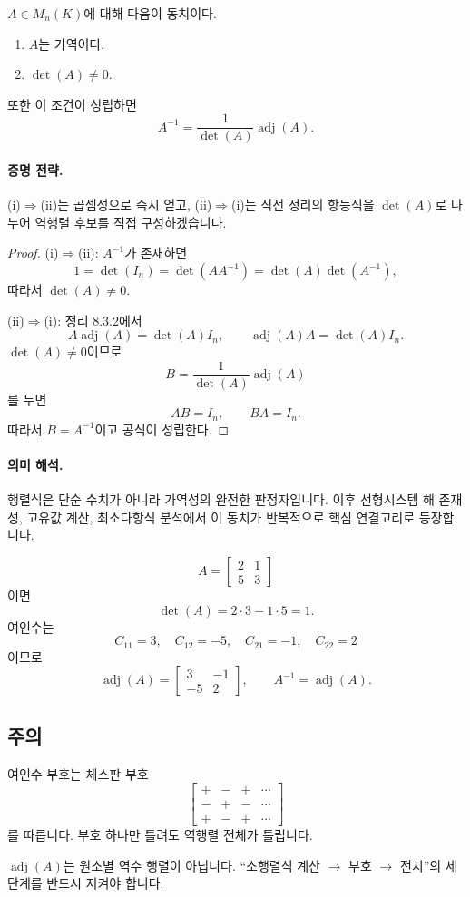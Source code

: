 \begin{theorem}
$A\in M_n(K)$에 대해 다음이 동치이다.
\begin{enumerate}[label=(\roman*)]
\item $A$는 가역이다.
\item $\det(A)\ne0$.
\end{enumerate}
또한 이 조건이 성립하면
$$
A^{-1}=\frac{1}{\det(A)}\operatorname{adj}(A).
$$
\end{theorem}

\paragraph{증명 전략.}
(i)$\Rightarrow$(ii)는 곱셈성으로 즉시 얻고, (ii)$\Rightarrow$(i)는 직전 정리의 항등식을 $\det(A)$로 나누어 역행렬 후보를 직접 구성하겠습니다.

\begin{proof}
(i)$\Rightarrow$(ii): $A^{-1}$가 존재하면
$$
1=\det(I_n)=\det(AA^{-1})=\det(A)\det(A^{-1}),
$$
따라서 $\det(A)\ne0$.

(ii)$\Rightarrow$(i): 정리 8.3.2에서
$$
A\operatorname{adj}(A)=\det(A)I_n,\qquad
\operatorname{adj}(A)A=\det(A)I_n.
$$
$\det(A)\ne0$이므로
$$
B=\frac{1}{\det(A)}\operatorname{adj}(A)
$$
를 두면
$$
AB=I_n,\qquad BA=I_n.
$$
따라서 $B=A^{-1}$이고 공식이 성립한다.
\end{proof}

\paragraph{의미 해석.}
행렬식은 단순 수치가 아니라 가역성의 완전한 판정자입니다. 이후 선형시스템 해 존재성, 고유값 계산, 최소다항식 분석에서 이 동치가 반복적으로 핵심 연결고리로 등장합니다.

\begin{example}
$$
A=\begin{bmatrix}2&1\\5&3\end{bmatrix}
$$
이면
$$
\det(A)=2\cdot3-1\cdot5=1.
$$
여인수는
$$
C_{11}=3,\quad C_{12}=-5,\quad C_{21}=-1,\quad C_{22}=2
$$
이므로
$$
\operatorname{adj}(A)=\begin{bmatrix}3&-1\\-5&2\end{bmatrix},
\qquad
A^{-1}=\operatorname{adj}(A).
$$
\end{example}

\subsection*{주의}
\begin{warning}
여인수 부호는 체스판 부호
$$
\begin{bmatrix}
+&-&+&\cdots\\
-&+&-&\cdots\\
+&-&+&\cdots
\end{bmatrix}
$$
를 따릅니다. 부호 하나만 틀려도 역행렬 전체가 틀립니다.
\end{warning}
\begin{warning}
$\operatorname{adj}(A)$는 원소별 역수 행렬이 아닙니다. ``소행렬식 계산 $\to$ 부호 $\to$ 전치''의 세 단계를 반드시 지켜야 합니다.
\end{warning}

